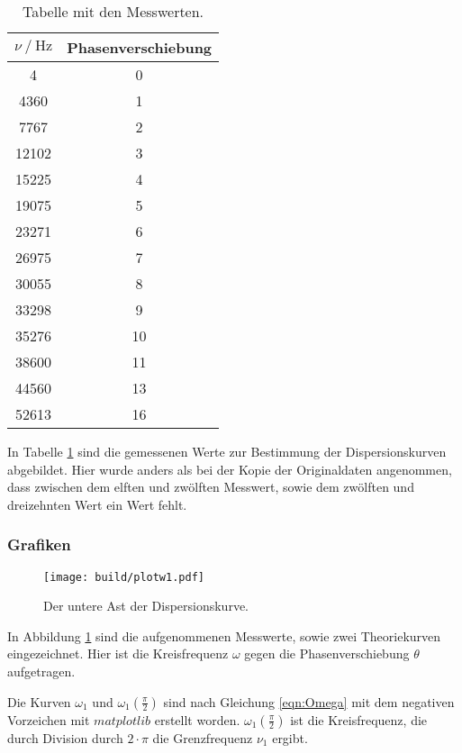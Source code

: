 \begin{table}
  \centering
  \caption{Tabelle mit den Messwerten.}
  \label{tab:wertedis}
  \begin{tabular}{c c}
    \toprule
     $\nu \ /\ \si{\hertz}$ & Phasenverschiebung\\
    \midrule
    4 & 0\\
    4360 & 1\\
    7767 & 2\\
    12102 & 3\\
    15225 & 4\\
    19075 & 5\\
    23271 & 6\\
    26975 & 7\\
    30055 & 8\\
    33298 & 9\\
    35276 & 10\\
    38600 & 11\\
    44560 & 13\\
    52613 & 16\\
    \bottomrule
  \end{tabular}
\end{table}

In Tabelle \ref{tab:wertedis} sind die gemessenen Werte zur Bestimmung der
Dispersionskurven abgebildet. Hier wurde anders als bei der Kopie der
Originaldaten angenommen, dass zwischen dem elften und zwölften Messwert,
sowie dem zwölften und dreizehnten Wert ein Wert fehlt.

\subsubsection{Grafiken}

\begin{figure}
  \centering
  \texttt{[image: build/plotw1.pdf]}
  \caption{Der untere Ast der Dispersionskurve.}
  \label{fig:astw1}
\end{figure}

In Abbildung \ref{fig:astw1} sind die aufgenommenen Messwerte, sowie zwei
Theoriekurven eingezeichnet. Hier ist die Kreisfrequenz $\omega$ gegen die
Phasenverschiebung
$\theta$ aufgetragen.

Die Kurven $\omega_1$ und $\omega_1(\frac{\pi}{2})$ sind nach Gleichung
\eqref{eqn:Omega} mit dem negativen
Vorzeichen mit $matplotlib$ \cite{matplotlib} erstellt worden.
$\omega_1(\frac{\pi}{2})$ ist die Kreisfrequenz, die durch Division durch
$2\cdot\pi$ die Grenzfrequenz $\nu_1$ ergibt.

